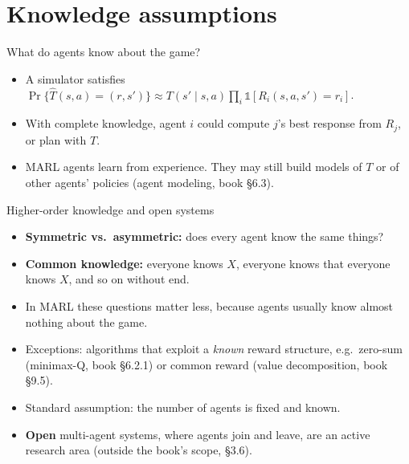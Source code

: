 \documentclass[aspectratio=169,11pt]{beamer}
\begin{document}
\section{Knowledge assumptions}

\begin{frame}{What do agents know about the game?}
  \centering
  
  \bigskip

  \begin{itemize}
    \item A simulator satisfies $\Pr\{\hat T(s,a) = (r, s')\} \approx T(s' \mid s, a) \prod_i \mathbb{1}[R_i(s,a,s') = r_i]$.
    \item With complete knowledge, agent $i$ could compute $j$'s best response from $R_j$, or plan with $T$.
    \item MARL agents learn from experience. They may still build models of $T$ or of other agents' policies (agent modeling, book \S6.3).
  \end{itemize}
\end{frame}

\begin{frame}{Higher-order knowledge and open systems}
  \begin{itemize}
    \item \textbf{Symmetric vs.\ asymmetric:} does every agent know the same things?
    \item \textbf{Common knowledge:} everyone knows $X$, everyone knows that everyone knows $X$, and so on without end.
    \item In MARL these questions matter less, because agents usually know almost nothing about the game.
    \item Exceptions: algorithms that exploit a \emph{known} reward structure, e.g.\ zero-sum (minimax-Q, book \S6.2.1) or common reward (value decomposition, book \S9.5).
  \end{itemize}
  \bigskip
  \begin{itemize}
    \item Standard assumption: the number of agents is fixed and known.
    \item \textbf{Open} multi-agent systems, where agents join and leave, are an active research area (outside the book's scope, \S3.6).
  \end{itemize}
\end{frame}
\end{document}
